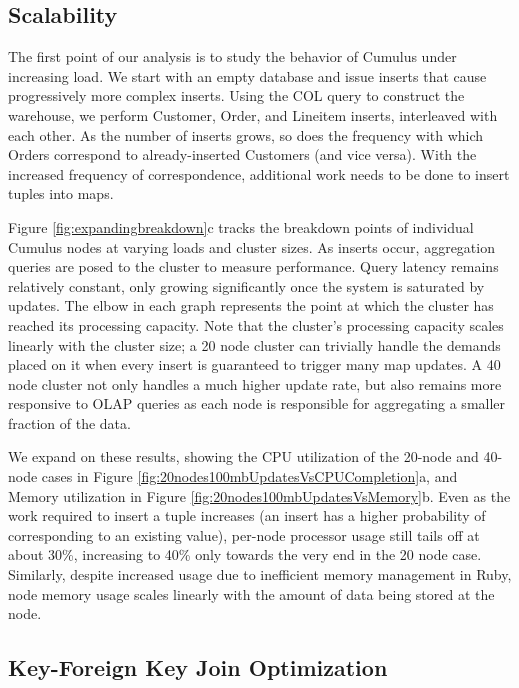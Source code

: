 \subsection{Scalability}

The first point of our analysis is to study the behavior of Cumulus under increasing load.  We start with an empty database and issue inserts that cause progressively more complex inserts.  Using the COL query to construct the warehouse, we perform Customer, Order, and Lineitem inserts, interleaved with each other.  As the number of inserts grows, so does the frequency with which Orders correspond to already-inserted Customers (and vice versa).  With the increased frequency of correspondence, additional work needs to be done to insert tuples into maps.  

Figure \ref{fig:expandingbreakdown}c tracks the breakdown points of individual Cumulus nodes at varying loads and cluster sizes.  As inserts occur, aggregation queries are posed to the cluster to measure performance.  Query latency remains relatively constant, only growing significantly once the system is saturated by updates.  The elbow in each graph represents the point at which the cluster has reached its processing capacity.  Note that the cluster's processing capacity scales linearly with the cluster size; a 20 node cluster can trivially handle the demands placed on it when every insert is guaranteed to trigger many map updates.  A 40 node cluster not only handles a much higher update rate, but also remains more responsive to OLAP queries as each node is responsible for aggregating a smaller fraction of the data.

We expand on these results, showing the CPU utilization of the 20-node and 40-node cases in Figure \ref{fig:20nodes100mbUpdatesVsCPUCompletion}a, and Memory utilization in Figure \ref{fig:20nodes100mbUpdatesVsMemory}b.  Even as the work required to insert a tuple increases (an insert has a higher probability of corresponding to an existing value), per-node processor usage still tails off at about 30\%, increasing to 40\% only towards the very end in the 20 node case.  Similarly, despite increased usage due to inefficient memory management in Ruby, node memory usage scales linearly with the amount of data being stored at the node.  



\subsection{Key-Foreign Key Join Optimization}


